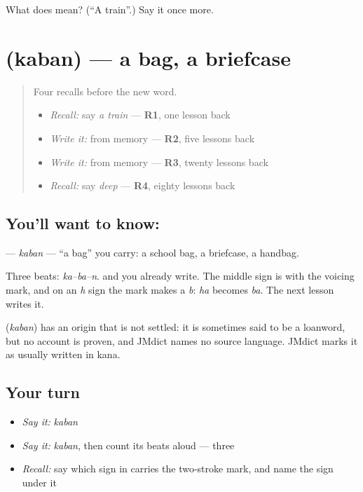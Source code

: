 \begin{tcolorbox}[breakable,colback=teal!4,colframe=teal!35!black,title={Before you move on}]
What does  mean? (\textquotedblleft{}A train\textquotedblright{}.) Say it once more.
\end{tcolorbox}
\section[\texorpdfstring{\ja{かばん} (kaban)}{かばん (kaban)}]{ (kaban) — a bag, a briefcase}

\label{lesson:JA-C134-kaban}



\begin{quote}
Four recalls before the new word.

\begin{itemize}
\raggedright
  \item \emph{Recall:} say \emph{a train} — \textbf{R1}, one lesson back
  \item \emph{Write it:} \textbf{} from memory — \textbf{R2}, five lessons back
  \item \emph{Write it:} \textbf{} from memory — \textbf{R3}, twenty lessons back
  \item \emph{Recall:} say \emph{deep} — \textbf{R4}, eighty lessons back
\end{itemize}
\end{quote}

\subsection*{You'll want to know: }
\textbf{} — \emph{kaban} — \textquotedblleft{}a bag\textquotedblright{} you carry: a school bag, a briefcase, a handbag.

Three beats: \emph{ka–ba–n}. \textbf{} and \textbf{} you already write. The middle sign is \textbf{} with the voicing mark, and on an \emph{h} sign the mark makes a \emph{b}: \emph{ha} becomes \emph{ba}. The next lesson writes it.

\begin{cousinweb}
\textbf{} (\emph{kaban}) has an origin that is not settled: it is sometimes said to be a loanword, but no account is proven, and JMdict names no source language. JMdict marks it as usually written in kana.
\end{cousinweb}

\subsection*{Your turn}
\begin{itemize}
\raggedright
  \item \emph{Say it:} \emph{kaban}
  \item \emph{Say it:} \emph{kaban}, then count its beats aloud — three
  \item \emph{Recall:} say which sign in \textbf{} carries the two-stroke mark, and name the sign under it
\end{itemize}

